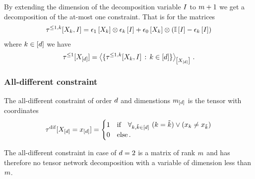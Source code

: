 


%
By extending the dimension of the decomposition variable $I$ to $m+1$ we get a decomposition of the at-most one constraint.
That is for the matrices
\begin{align*}
    \tau^{\leq 1, k}[X_{k},I]
    = \epsilon_{1}\left[X_{k}\right] \otimes \epsilon_{k}\left[I\right]
    + \epsilon_{0}\left[X_{k}\right] \otimes \left(\mathbb{I}\left[I\right]-\epsilon_{k}\left[I\right]\right)
\end{align*}
where $k\in[d]$ we have
\begin{align*}
    \tau^{\leq 1}[X_{[d]}]
    = \left\langle 
        \{\tau^{\leq 1, k}[X_{k},I]
        \,:\, k\in[d]\}
    \right\rangle_{\left[ X_{[d]} \right]} \, .
\end{align*}



\subsubsection{All-different constraint}

The all-different constraint of order $d$ and dimenstions $m_{[d]}$ is the tensor with coordinates
\begin{align*}
    \tau^{\mathrm{dif}}[X_{[d]}=x_{[d]}]
    = \begin{cases}
          1 & \text{if}\quad \forall_{k,\tilde{k}\in[d]} \,\, {(k=\tilde{k}) \lor (x_{k}\neq x_{\tilde{k}})} \\
          0 & \text{else} \, .
    \end{cases}
\end{align*}



The all-different constraint in case of $d=2$ is a matrix of rank $m$ and has therefore no tensor network decomposition with a variable of dimension less than $m$.


